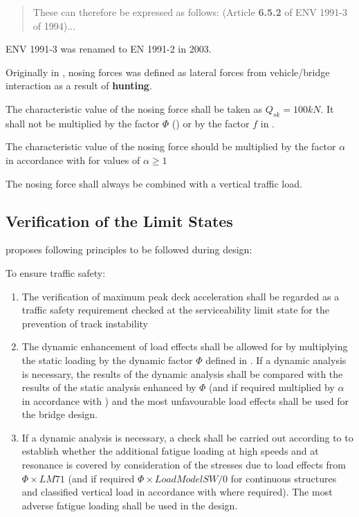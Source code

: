 \begin{appendices}
\begin{quote}
	These can therefore be expressed as follows: (Article \textbf{6.5.2} of ENV 1991-3 of 1994)...
\end{quote}

ENV 1991-3 was renamed to EN 1991-2 in 2003.

Originally in \citet[4:Draft Recommendations]{d181}, nosing forces was defined as lateral forces from vehicle/bridge interaction as a result of \textbf{hunting}.

The characteristic value of the nosing force shall be taken as $Q_{sk} = 100kN$. It shall not be multiplied by the factor $\Phi$ (\citet[6.45]{EC12}) or by the factor $f$ in \citet[6.51]{EC12}. 

The characteristic value of the nosing force should be multiplied by the factor $\alpha$ in accordance with \citet[6.3.2]{EC12} for values of $\alpha \geq 1$

The nosing force shall always be combined with a vertical traffic load.



\subsection{Verification of the Limit States}
\citet[6.4.6.5]{EC12} proposes following principles to be followed during design:

To ensure traffic safety:
\begin{enumerate}
	\item The verification of maximum peak deck acceleration shall be regarded as a traffic safety requirement checked at the serviceability limit state for the prevention of track instability
	\item The dynamic enhancement of load effects shall be allowed for by multiplying the static loading by the dynamic factor $\varPhi$ defined in \citet[6.4.5]{EC12}. If a dynamic analysis is necessary, the results of the dynamic analysis shall be compared with the results of the static analysis enhanced by $\varPhi$ (and if required multiplied by $\alpha$ in accordance with \citet[6.3.2]{EC12}) and the most unfavourable load effects shall be used for the bridge design.
	\item If a dynamic analysis is necessary, a check shall be carried out according to \citet[6.4.6.6]{EC12} to establish whether the additional fatigue loading at high speeds and at resonance is covered by consideration of the stresses due to load effects from $\varPhi \times LM71$ (and if required $\varPhi \times Load Model SW/0$ for continuous structures and classified vertical load in accordance with \citet[6.3.2(3)]{EC12} where required). The most adverse fatigue loading shall be used in the design.  
\end{enumerate}


\end{appendices}
